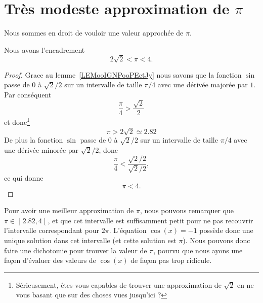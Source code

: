 
\section{Très modeste approximation de \texorpdfstring{\(  \pi\)}{pi}}

Nous sommes en droit de vouloir une valeur approchée de \( \pi\).
\begin{lemma}       \label{LEMooJWSGooExmtDA}
	Nous avons l'encadrement
	\begin{equation}
		2\sqrt{ 2 }<\pi<4.
	\end{equation}
\end{lemma}

\begin{proof}
	Grace au lemme~\ref{LEMooIGNPooPEctJy} nous savons que la fonction \( \sin\) passe de \( 0\) à \( \sqrt{ 2 }/2\) sur un intervalle de taille \( \pi/4\) avec une dérivée majorée par \( 1\). Par conséquent
	\begin{equation}
		\frac{ \pi }{ 4 }>\frac{ \sqrt{ 2 } }{2}
	\end{equation}
	et donc\footnote{Sérieusement, êtes-vous capables de trouver une approximation de \( \sqrt{ 2 }\) en ne vous basant que sur des choses vues jusqu'ici ?}
	\begin{equation}
		\pi>2\sqrt{ 2 }\simeq 2.82
	\end{equation}
	De plus la fonction \( \sin\) passe de \( 0\) à \( \sqrt{ 2 }/2\) sur un intervalle de taille \( \pi/4\) avec une dérivée minorée par \( \sqrt{ 2 }/2\), donc
	\begin{equation}
		\frac{ \pi }{ 4 }<\frac{ \sqrt{ 2 }/2 }{ \sqrt{ 2 }/2 },
	\end{equation}
	ce qui donne
	\begin{equation}
		\pi<4.
	\end{equation}
\end{proof}


Pour avoir une meilleur approximation de \( \pi\), nous pouvons remarquer que \( \pi\in\mathopen\rbrack 2.82 , 4 \mathclose\lbrack\), et que cet intervalle est suffisamment petit pour ne pas recouvrir l'intervalle correspondant pour \( 2\pi\). L'équation \( \cos(x)=-1\) possède donc une unique solution dans cet intervalle (et cette solution est \( \pi\)). Nous pouvons donc faire une dichotomie pour trouver la valeur de \( \pi\), pourvu que nous ayons une façon d'évaluer des valeurs de \( \cos(x)\) de façon pas trop ridicule.

